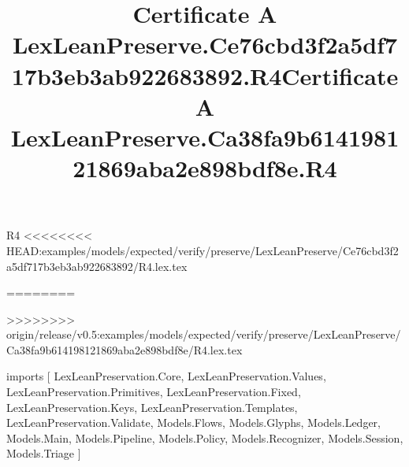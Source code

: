 \begin{lexlean}{R4}
<<<<<<<< HEAD:examples/models/expected/verify/preserve/LexLeanPreserve/Ce76cbd3f2a5df717b3eb3ab922683892/R4.lex.tex
\title{Certificate A LexLeanPreserve.Ce76cbd3f2a5df717b3eb3ab922683892.R4}
========
\title{Certificate A LexLeanPreserve.Ca38fa9b614198121869aba2e898bdf8e.R4}
>>>>>>>> origin/release/v0.5:examples/models/expected/verify/preserve/LexLeanPreserve/Ca38fa9b614198121869aba2e898bdf8e/R4.lex.tex
\begin{coremodule}
imports [
  LexLeanPreservation.Core,
  LexLeanPreservation.Values,
  LexLeanPreservation.Primitives,
  LexLeanPreservation.Fixed,
  LexLeanPreservation.Keys,
  LexLeanPreservation.Templates,
  LexLeanPreservation.Validate,
  Models.Flows,
  Models.Glyphs,
  Models.Ledger,
  Models.Main,
  Models.Pipeline,
  Models.Policy,
  Models.Recognizer,
  Models.Session,
  Models.Triage
]


\end{coremodule}
\end{lexlean}
